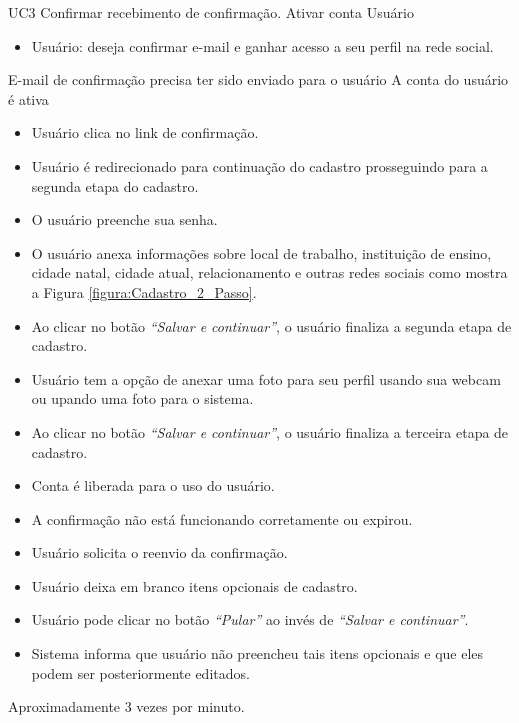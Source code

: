 \casoDeUso
{UC3}
{Confirmar recebimento de confirmação. Ativar conta}
{Usuário}
{
\begin{itemize}
	\item Usuário: deseja confirmar e-mail e ganhar acesso a seu perfil na rede social.
\end{itemize}

}
{E-mail de confirmação precisa ter sido enviado para o usuário}
{A conta do usuário é ativa}
{
\begin{itemize}
	\item Usuário clica no link de confirmação.
	\item Usuário é redirecionado para continuação do cadastro prosseguindo para a segunda etapa do cadastro.		
	\item O usuário preenche sua senha.
	\item O usuário anexa informações sobre local de trabalho, instituição de ensino, cidade natal, cidade atual, relacionamento e outras redes sociais como mostra a Figura \ref{figura:Cadastro_2_Passo}.
	\item Ao clicar no botão \textit{“Salvar e continuar”}, o usuário finaliza a segunda etapa de cadastro.	
	\item Usuário tem a opção de anexar uma foto para seu perfil usando sua webcam ou upando uma foto para o sistema.%
	\item Ao clicar no botão \textit{“Salvar e continuar”}, o usuário finaliza a terceira etapa de cadastro. 		
	\item Conta é liberada para o uso do usuário.		 
\end{itemize}
}
{
\begin{itemize}
	\item A confirmação não está funcionando corretamente ou expirou.
	\item Usuário solicita o reenvio da confirmação.
	
	\item Usuário deixa em branco itens opcionais de cadastro.
	\item Usuário pode clicar no botão \textit{“Pular”} ao invés de \textit{“Salvar e continuar”}.
	
	\item Sistema informa que usuário não preencheu tais itens opcionais e que eles podem ser posteriormente editados.
	
\end{itemize}
}
{Aproximadamente 3 vezes por minuto.}
{

}

